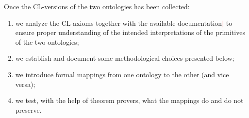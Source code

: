 \documentclass[ao]{iosart2x}
\newcommand{\nb}[1]{\textcolor{red}{$|$}\marginpar{\hspace*{-0cm}\parbox{20mm}{\scriptsize\raggedright\textcolor{red}{#1}}}}
\newcommand{\dolce}{{\textsc{dolce}}}
\newcommand{\bfo}{{\textsc{bfo}}}
\begin{document}
Once the CL-versions of the two ontologies has been collected: %
%
\begin{enumerate}
\item we analyze the CL-axioms together with the available documentation\nb{CM: citare alemeno il documento di bfo che abbiamo considerato} to ensure proper understanding of the intended interpretations of the primitives of the two ontologies;
 \item we establish and document some methodological choices presented below;
\item we introduce formal mappings from one ontology to the other (and vice versa);
\item we test, with the help of theorem provers, what the mappings do and do not preserve.
\end{enumerate}
\end{document}
